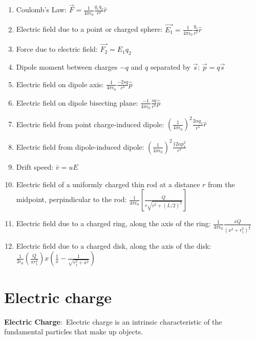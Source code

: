 \documentclass[nobib]{tufte-handout}
\newcommand{\defn}[2]{\noindent\textbf{#1}:\ #2}
\begin{document}
\begin{enumerate}
    \item Coulomb's Law: $\vec{F} = \frac{1}{4\pi \epsilon_0}\frac{q_1 q_2}{r^2}\hat{r}$
    \item Electric field due to a point or charged sphere: $\vec{E_1} = \frac{1}{4\pi \epsilon_0}\frac{q_1}{r^2}\hat{r}$
    \item Force due to electric field: $\vec{F_2} = E_1 q_2$
    \item Dipole moment between charges $-q$ and $q$ separated by $\vec{s}$: $\vec{p} = q\vec{s}$
    \item Electric field on dipole axis: $\frac{1}{4\pi \epsilon_0}\frac{-2sq}{r^3}\hat{p}$
    \item Electric field on dipole bisecting plane: $\frac{-1}{4 \pi \epsilon_0}\frac{sq}{r^3}\hat{p}$
    \item Electric field from point charge-induced dipole: $\left(\frac{1}{4\pi \epsilon_0}\right)^2 \frac{2 \alpha q_1}{r^5}\hat{r}$
    \item Electric field from dipole-induced dipole: $\left(\frac{1}{4\pi \epsilon_0}\right)^2 \frac{12 \alpha p_1^2}{r^7}$
    \item Drift speed: $\bar{v} = uE$
    \item Electric field of a uniformly charged thin rod at a distance $r$ from the midpoint,
    perpindicular to the rod: $\frac{1}{4 \pi \epsilon_0}\left[\frac{Q}{r\sqrt{r^2+(L/2)^2}}\right]$
    \item Electric field due to a charged ring, along the axis of the ring:
    $\frac{1}{4 \pi \epsilon_0}\frac{xQ}{\left(x^{2}+r_{1}^{2}\right)^{\frac{3}{2}}}$
    \item Electric field due to a charged disk, along the axis of the disk:
    $\frac{1}{2 \epsilon_0}\left(\frac{Q}{\pi r_{1}^{2}}\right)x\left(\frac{1}{x}-\frac{1}{\sqrt{r_{1}^{2}+x^{2}}}\right)$
\end{enumerate}

\pagebreak

\section{Electric charge}

\defn{Electric Charge}{Electric charge is an intrinsic characteristic of the
fundamental particles that make up objects.}

\end{document}
